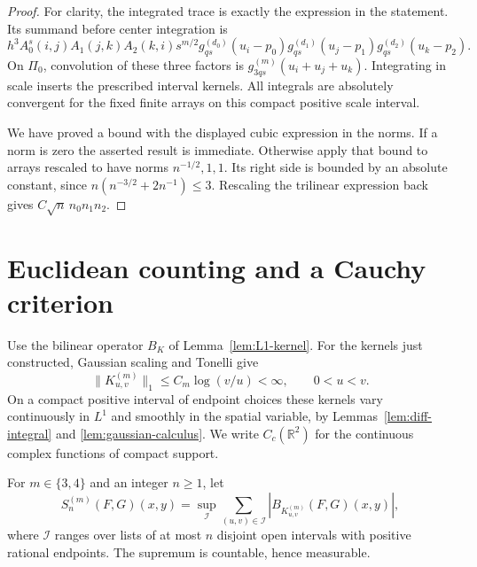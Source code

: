 \documentclass[11pt]{article}
\theoremstyle{remark}\newtheorem{remark}[theorem]{Remark}
\newcommand{\R}{\mathbb R}\newcommand{\C}{\mathbb C}
\begin{document}
\begin{proof}
For clarity, the integrated trace is exactly the expression in the statement. Its summand before center integration is
\[
 h^3 A_0^s(i,j)A_1(j,k)A_2(k,i)s^{m/2}
 g_{qs}^{(d_0)}(u_i-p_0)g_{qs}^{(d_1)}(u_j-p_1)g_{qs}^{(d_2)}(u_k-p_2).
\]
On $\Pi_0$, convolution of these three factors is $g_{3qs}^{(m)}(u_i+u_j+u_k)$. Integrating in scale inserts the prescribed interval kernels. All integrals are absolutely convergent for the fixed finite arrays on this compact positive scale interval.

We have proved a bound with the displayed cubic expression in the norms. If a norm is zero the asserted result is immediate. Otherwise apply that bound to arrays rescaled to have norms $n^{-1/2},1,1$. Its right side is bounded by an absolute constant, since $n(n^{-3/2}+2n^{-1})\leq3$. Rescaling the trilinear expression back gives $C\sqrt n\,n_0n_1n_2$.
\end{proof}

\section{Euclidean counting and a Cauchy criterion}\label{sec:count}
Use the bilinear operator $B_K$ of Lemma~\ref{lem:L1-kernel}. For the kernels just constructed, Gaussian scaling and Tonelli give
\[
 \|K^{(m)}_{u,v}\|_1\le C_m\log(v/u)<\infty,\qquad 0<u<v.
\]
On a compact positive interval of endpoint choices these kernels vary continuously in $L^1$ and smoothly in the spatial variable, by Lemmas~\ref{lem:diff-integral} and \ref{lem:gaussian-calculus}. We write $C_c(\R^2)$ for the continuous complex functions of compact support.

For $m\in\{3,4\}$ and an integer $n\geq1$, let
\[
 S^{(m)}_n(F,G)(x,y)=\sup_{\mathcal I}\sum_{(u,v)\in\mathcal I}
                  |B_{K^{(m)}_{u,v}}(F,G)(x,y)|,
\]
where $\mathcal I$ ranges over lists of at most $n$ disjoint open intervals with positive rational endpoints. The supremum is countable, hence measurable.
\end{document}
